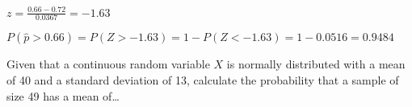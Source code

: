 \documentclass[noanswers]{exam}
\begin{document}
\begin{questions}
\begin{parts}
\begin{solution}[\stretch{1}]
\vspace{3mm}

$z=\frac{0.66-0.72}{0.0367}=-1.63$

\vspace{3mm}

$P(\hat{p}>0.66)=P(Z>-1.63)=1-P(Z<-1.63)=1-0.0516=0.9484$
\end{solution}

\end{parts}


\newpage

\question Given that a continuous random variable $X$ is normally distributed with a mean of 40 and a standard deviation of 13, calculate the probability that a sample of size 49 has a mean of\dots

\vspace{3mm}

\end{questions}
\end{document}
